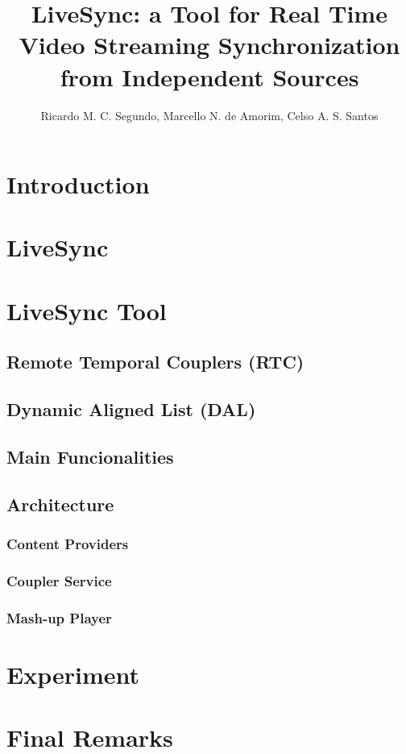 \documentclass[jidm,a4paper]{jidm} %
\title{LiveSync: a Tool for Real Time Video Streaming Synchronization from Independent Sources}
\author{Ricardo M. C. Segundo\inst{1}, Marcello N. de Amorim\inst{2}, Celso A. S. Santos\inst{3}}
\institute{Federal University of  Espirito Santo, Brazil  \\ \email{rmcs87@gmail.com , novaes@inf.ufes.br , saibel@inf.ufes.br}
}
\begin{document}
\begin{bottomstuff}

\end{bottomstuff}

\maketitle

\section{Introduction}




\section{LiveSync}


\section{LiveSync Tool}


\subsection{Remote Temporal Couplers (RTC)}


\subsection{Dynamic Aligned List (DAL)}


\subsection{Main Funcionalities}


\subsection{Architecture}


\subsubsection{Content Providers}


\subsubsection{Coupler Service}


\subsubsection{Mash-up Player}


\section{Experiment}


\section{Final Remarks}




\end{document}

